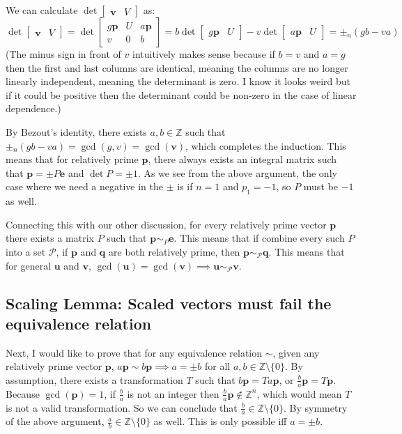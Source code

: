 \documentclass{article}
\def\u{\textbf{u}}
\def\v{\textbf{v}}
\def\p{\textbf{p}}
\def\q{\textbf{q}}
\def\e{\textbf{e}}
\def\Z{\mathbb{Z}}
\def\P{\mathcal{P}}
\begin{document}
We can calculate $\det\begin{bmatrix}\v & V\end{bmatrix}$ as:
\begin{equation*}
    \det\begin{bmatrix}\v & V\end{bmatrix}=\det\begin{bmatrix}
        g\p & U & a\p\\
        v & 0 & b
    \end{bmatrix}=b\det\begin{bmatrix}g\p & U\end{bmatrix} - v\det\begin{bmatrix}a\p & U\end{bmatrix} = \pm_{n}(gb - va)
\end{equation*}
(The minus sign in front of $v$ intuitively makes sense because if $b=v$ and $a=g$ then the first and last columns are identical, meaning the columns are no longer linearly independent, meaning the determinant is zero. I know it looks weird but if it could be positive then the determinant could be non-zero in the case of linear dependence.)

By Bezout's identity, there exists $a,b\in\Z$ such that $\pm_{n}(gb - va)=\gcd(g,v)=\gcd(\v)$, which completes the induction. This means that for relatively prime $\p$, there always exists an integral matrix such that $\p=\pm P\e$ and $\det P=\pm1$. As we see from the above argument, the only case where we need a negative in the $\pm$ is if $n=1$ and $p_1=-1$, so $P$ must be $-1$ as well.

Connecting this with our other discussion, for every relatively prime vector $\p$ there exists a matrix $P$ such that $\p\sim_P \e$. This means that if combine every such $P$ into a set $\P$, if $\p$ and $\q$ are both relatively prime, then $\p\sim_\P \q$. This means that for general $\u$ and $\v$, $\gcd(\u)=\gcd(\v) \implies \u\sim_\P \v$.

\subsection{Scaling Lemma: Scaled vectors must fail the equivalence relation}
Next, I would like to prove that for any equivalence relation $\sim$, given any relatively prime vector $\p$, $a\p\sim b\p \implies a=\pm b$ for all $a,b\in\Z\setminus\{0\}$. By assumption, there exists a transformation $T$ such that $b\p=Ta\p$, or $\frac{b}{a}\p=T\p$. Because $\gcd(\p)=1$, if $\frac{b}{a}$ is not an integer then $\frac{b}{a}\p\not\in\Z^n$, which would mean $T$ is not a valid transformation. So we can conclude that $\frac{b}{a}\in\Z\setminus\{0\}$. By symmetry of the above argument, $\frac{a}{b}\in\Z\setminus\{0\}$ as well. This is only possible iff $a=\pm b$.
\end{document}
